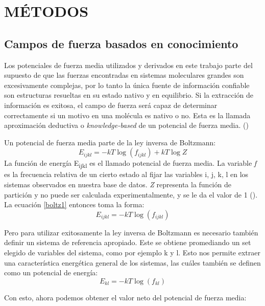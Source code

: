 \newpage
\section*{MÉTODOS}
\par{}
\subsection{Campos de fuerza basados en conocimiento}
\par
Los potenciales de fuerza media utilizados y derivados en este trabajo parte del supuesto de que las fuerzas encontradas en sistemas moleculares grandes son excesivamente complejas, por lo tanto la única fuente de información confiable son estructuras resueltas en su estado nativo y en equilibrio. 
Si la extracción de información es exitosa, el campo de fuerza será capaz de determinar correctamente si un motivo en una molécula es nativo o no. 
Esta es la llamada aproximación deductiva o \textit{knowledge-based} de un potencial de fuerza 
media. (\cite{Sippl1993})
\par
Un potencial de fuerza media parte de la ley inversa de Boltzmann:
\begin{equation}
E_{ijkl} = -kT\log(f_{ijkl}) + kT\log Z \label{boltz1}
\end{equation}
La función de energía E\textsubscript{ijkl} es el llamado potencial de fuerza media. 
La variable \textit{f} es la frecuencia relativa de un cierto estado al fijar las variables i, j, k, l en 
los sistemas observados en nuestra base de datos. 
\textit{Z} representa la función de partición y no puede ser calculada experimentalmente, y se le da el 
valor de 1 (\cite{Sippl1993}). 
La ecuación \eqref{boltz1}  entonces toma la forma:
\begin{equation}
E_{ijkl} = -kT\log(f_{ijkl}) \label{boltz2}
\end{equation}
\par
Pero para utilizar exitosamente la ley inversa de Boltzmann es necesario también definir un sistema de referencia apropiado. 
Este se obtiene promediando un set elegido de variables del sistema, como por ejemplo k y l.
Esto nos permite extraer una característica energética general de los sistemas, las cuáles también se definen como un potencial de energía:
\begin{equation}
E_{kl} = -kT\log(f_{kl}) \label{boltzref}
\end{equation}
\par
Con esto, ahora podemos obtener el valor neto del potencial de fuerza media:
